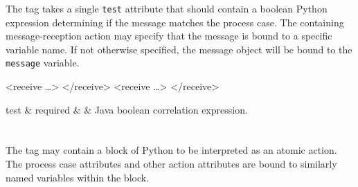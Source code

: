 The  tag takes a single \verb|test| attribute
that should contain a boolean Python expression determining if
the message matches the process case.  The containing message-reception
action may specify that the message is bound to a specific variable
name.  If not otherwise specified, the message object will be
bound to the \verb|message| variable. 

\begin{codelisting}
<receive \dots>
</receive>
<receive  \dots>
</receive>
\end{codelisting}

\begin{attrDefs}
test		&	required	&			& Java boolean correlation expression. \\
\end{attrDefs}

\section{}

The  tag may contain a block of Python
to be interpreted as an atomic action.  The process case
attributes and other action attributes are bound to similarly
named variables within the block.

\begin{codelisting}
\end{codelisting}

